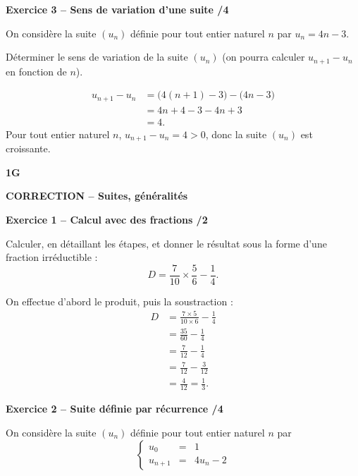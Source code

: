 \documentclass[10pt,a4paper]{article}
\renewcommand{\niveau}{1G}
\renewcommand{\chapitre}{Suites, généralités}
\renewcommand{\interroversion}[1]{
    \noindent\textbf{\niveau}

    \vspace{-0.5cm}
    \begin{center}
        \textbf{\large CORRECTION -- \chapitre}
    \end{center}

    \vspace{0.1cm}
}
\begin{document}
\textbf{Exercice 3 -- Sens de variation d'une suite \hfill /4}

On considère la suite \((u_n)\) définie pour tout entier naturel \(n\) par \(u_n=4n-3\).

Déterminer le sens de variation de la suite \((u_n)\) (on pourra calculer \(u_{n+1}-u_n\) en fonction de \(n\)).

\[
\begin{aligned}
u_{n+1}-u_n &= \bigl(4(n+1)-3\bigr)-\bigl(4n-3\bigr)\\
            &= 4n+4-3-4n+3\\
            &= 4.
\end{aligned}
\]
Pour tout entier naturel \(n\), \(u_{n+1}-u_n=4>0\), donc la suite \((u_n)\) est croissante.

\newpage


\interroversion{D}

\textbf{Exercice 1 -- Calcul avec des fractions \hfill /2}

Calculer, en détaillant les étapes, et donner le résultat sous la forme d'une fraction irréductible :
\[
D = \frac{7}{10}\times\frac{5}{6}-\frac{1}{4}.
\]

On effectue d'abord le produit, puis la soustraction :
\[
\begin{aligned}
D &= \frac{7\times5}{10\times6}-\frac{1}{4}\\
  &= \frac{35}{60}-\frac{1}{4}\\
  &= \frac{7}{12}-\frac{1}{4}\\
  &= \frac{7}{12}-\frac{3}{12}\\
  &= \frac{4}{12}=\frac{1}{3}.
\end{aligned}
\]

\textbf{Exercice 2 -- Suite définie par récurrence \hfill /4}

On considère la suite \((u_n)\) définie pour tout entier naturel \(n\) par
\[
\left\{\begin{array}{rcl}
u_0 &=& 1 \\
u_{n+1} &=& 4u_n-2
\end{array}\right.
\]
\end{document}
